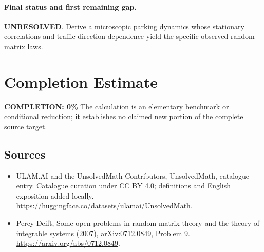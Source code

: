 \documentclass[11pt]{article}
\begin{document}
\paragraph{Final status and first remaining gap.}
\textbf{UNRESOLVED}. Derive a microscopic parking dynamics whose stationary correlations and traffic-direction dependence yield the specific observed random-matrix laws.

\section{Completion Estimate}
\noindent\textbf{COMPLETION: 0\%}
The calculation is an elementary benchmark or conditional reduction; it establishes no claimed new portion of the complete source target.

\subsection{Sources}
\begin{itemize}
\item[\hypertarget{source:statement:1}{S1}] ULAM.AI and the UnsolvedMath Contributors, UnsolvedMath, catalogue entry. Catalogue curation under CC BY 4.0; definitions and English exposition added locally.
\url{https://huggingface.co/datasets/ulamai/UnsolvedMath}.
\item[\hypertarget{source:statement:2}{S2}] Percy Deift, Some open problems in random matrix theory and the theory of integrable systems (2007), arXiv:0712.0849, Problem 9.
\url{https://arxiv.org/abs/0712.0849}.
\end{itemize}
\label{end:statement}
\end{document}
